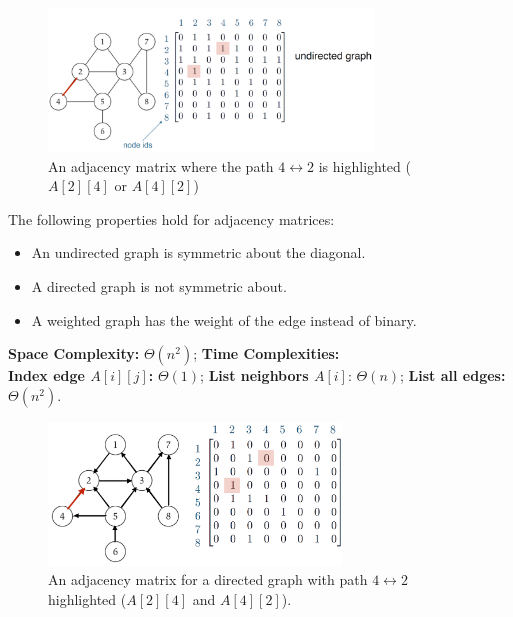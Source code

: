   
\begin{figure}[h]
  \begin{center}
    \includegraphics[height=1.5in]{./Sections/graphs/adj_matrix.png}
  \end{center}
   \caption{An adjacency matrix where the path $4\leftrightarrow2$ is highlighted ($A[2][4]$ or $A[4][2]$)}\label{fig:adj_matrix}
\end{figure}
\begin{theo}

  The following properties hold for adjacency matrices:
    \begin{itemize}
        \item An undirected graph is symmetric about the diagonal.
        \item A directed graph is not symmetric about.
        \item A weighted graph has the weight of the edge instead of binary.
    \end{itemize}
    \noindent
    \textbf{Space Complexity:} $\Theta (n^2)$; \textbf{Time Complexities:}\\
    \textbf{Index edge $A[i][j]$:} $\Theta (1)$; \textbf{List neighbors $A[i]$}: $\Theta(n)$; \textbf{List all edges:} $\Theta(n^2)$.
\end{theo}
\begin{figure}[h]
  \begin{center}
    \includegraphics[height=1.5in]{./Sections/graphs/adj_matrix_dir.png}
  \end{center}
   \caption{An adjacency matrix for a directed graph with path $4\leftrightarrow2$ highlighted ($A[2][4]$ and $A[4][2]$).}\label{fig:adj_matri_dir}
\end{figure}

